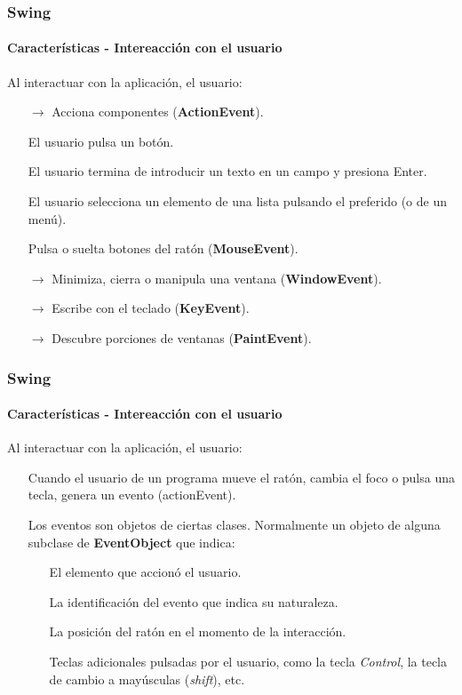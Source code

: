 \documentclass{beamer}
\begin{document}

	\begin{frame}
		\frametitle{Swing}
		\framesubtitle{Caracter\'isticas - Intereacci\'on con el usuario}

        Al interactuar con la aplicaci\'on, el usuario:

	    \begin{itemize}
		    \item[$\rightarrow$] Acciona componentes (\textbf{ActionEvent}).
		    \item[] El usuario pulsa un bot\'on.
		    \item[] El usuario termina de introducir un texto en un campo y presiona Enter.
		    \item[] El usuario selecciona un elemento de una lista pulsando el preferido (o de un men\'u).
		    \item[] Pulsa o suelta botones del rat\'on (\textbf{MouseEvent}).
		    \item[$\rightarrow$] Minimiza, cierra o manipula una ventana (\textbf{WindowEvent}).
		    \item[$\rightarrow$] Escribe con el teclado (\textbf{KeyEvent}).
		    \item[$\rightarrow$] Descubre porciones de ventanas (\textbf{PaintEvent}).
        \end{itemize}
	\end{frame}

	\begin{frame}
		\frametitle{Swing}
		\framesubtitle{Caracter\'isticas - Intereacci\'on con el usuario}

        Al interactuar con la aplicaci\'on, el usuario:

	    \begin{itemize}
		    \item[] Cuando el usuario de un programa mueve el rat\'on, cambia el foco o pulsa una tecla, genera un evento (actionEvent).
		    \item[] Los eventos son objetos de ciertas clases. Normalmente un objeto de alguna subclase de \textbf{EventObject} que indica:
		    \begin{itemize}
        		    \item[\checkmark] El elemento que accion\'o el usuario.
        		    \item[\checkmark] La identificaci\'on del evento que indica su naturaleza.
        		    \item[\checkmark] La posici\'on del rat\'on en el momento de la interacci\'on.
        		    \item[\checkmark] Teclas adicionales pulsadas por el usuario, como la tecla \emph{Control}, la tecla de cambio a may\'usculas (\emph{shift}), etc.
	    	    \end{itemize}
        \end{itemize}
	\end{frame}
\end{document}
